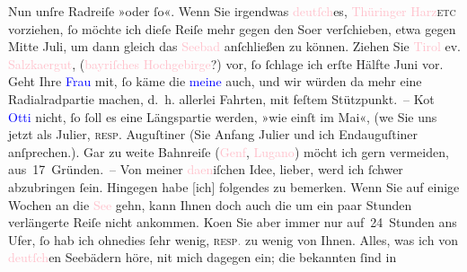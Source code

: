 \pstart
           Nun unſre Radreiſe »oder ſo«. Wenn Sie irgendwas \textcolor{pink}{deutſch}{}\ledrightnote{{$\rightarrow$}\textcolor{pink}{Deutschland}}es, \textcolor{pink}{Thüringer Harz}{}\ledrightnote{\textcolor{pink}{Harz}}{ }\textsc{etc} vorziehen, ſo möchte ich dieſe Reiſe mehr gegen den
                  So{\geminationm}er verſchieben, etwa gegen Mitte Juli, um dann gleich das \textcolor{pink}{Seebad}{}\ledrightnote{{$\rightarrow$}\textcolor{pink}{Marienlyst}} an{\pb}ſchließen zu
               können. Ziehen Sie \textcolor{pink}{Tirol}{}\ledrightnote{\textcolor{pink}{Tirol}{\newline}\textcolor{pink}{Südtirol}} ev. \textcolor{pink}{Salzka{\geminationm}ergut}{}\ledrightnote{\textcolor{pink}{Salzkammergut}}, (\textcolor{pink}{bayriſches Hochgebirge}{}\ledrightnote{\textcolor{pink}{Bayern}}?) vor, ſo ſchlage ich erſte
               Hälfte Juni vor. Geht Ihre \textcolor{blue}{Frau}{}\ledrightnote{{$\rightarrow$}\textcolor{blue}{Ottilie Salten}} mit, ſo käme die \textcolor{blue}{meine}{}\ledrightnote{{$\rightarrow$}\textcolor{blue}{Olga Schnitzler}} auch, und wir würden da{\geminationn} mehr eine Radialradpartie machen, d. h. allerlei
               Fahrten, mit feſtem Stützpunkt. – Ko{\geminationm}t \textcolor{blue}{Otti}{}\ledrightnote{\textcolor{blue}{Ottilie Salten}} nicht, ſo ſoll es eine Längspartie werden, »wie einſt im
               Mai«, (we{\geminationn} Sie uns jetzt als Julier, \textsc{resp.} Auguſtiner (Sie \introOben{}Anfang\introOben{} Julier
               und ich Endauguſtiner anſprechen.). Gar zu weite Bahnreiſe (\textcolor{pink}{Genf}{}\ledrightnote{\textcolor{pink}{Genf}}, \textcolor{pink}{Lugano}{}\ledrightnote{\textcolor{pink}{Lugano}}) möcht ich
               gern vermeiden, {\pb}aus 17 Gründen. – Von meiner
                  \textcolor{pink}{daen}{}\ledrightnote{{$\rightarrow$}\textcolor{pink}{Dänemark}}iſchen Idee, lieber,
               werd ich ſchwer abzubringen ſein. Hingegen habe {[}ich{]} folgendes zu
               bemerken. Wenn Sie auf einige Wochen an die \textcolor{pink}{See}{}\ledrightnote{{$\rightarrow$}\textcolor{pink}{Ostsee}} gehn, kann Ihnen doch auch die um ein paar Stunden
               verlängerte Reiſe nicht ankommen. Ko{\geminationm}en Sie aber immer
               nur auf 24 Stunden ans Ufer, ſo hab ich ohnedies ſehr wenig, \textsc{resp\textcolor{gray}{.}} zu wenig von Ihnen. Alles, was ich von \textcolor{pink}{deutſch}{}\ledrightnote{{$\rightarrow$}\textcolor{pink}{Deutschland}}en Seebädern höre, ni{\geminationm}t
               mich dagegen ein; die bekannten {\pb}ſind in
